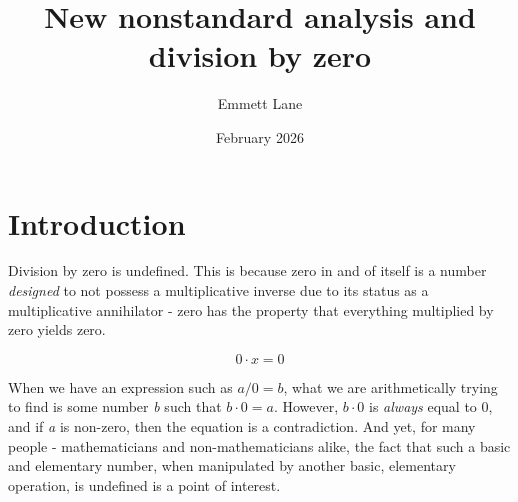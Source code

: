 \documentclass{article}
\title{New nonstandard analysis and division by zero}
\author{Emmett Lane}
\date{February 2026}
\begin{document}
\setcounter{secnumdepth}{0}
\maketitle
\newpage
\tableofcontents
\newpage


\section{Introduction}

Division by zero is undefined. This is because zero in and of itself is a number \textit{designed} to not possess a multiplicative inverse due to its status as a multiplicative annihilator - zero has the property that everything multiplied by zero yields zero.

\[
0 \cdot x = 0
\]

When we have an expression such as $a/0 = b$, what we are arithmetically trying to find is some number \textit{b} such that $b \cdot 0 = a$. However, $b \cdot 0$ is \textit{always} equal to 0, and if \textit{a} is non-zero, then the equation is a contradiction. And yet, for many people - mathematicians and non-mathematicians alike, the fact that such a basic and elementary number, when manipulated by another basic, elementary operation, is undefined is a point of interest.
\end{document}
